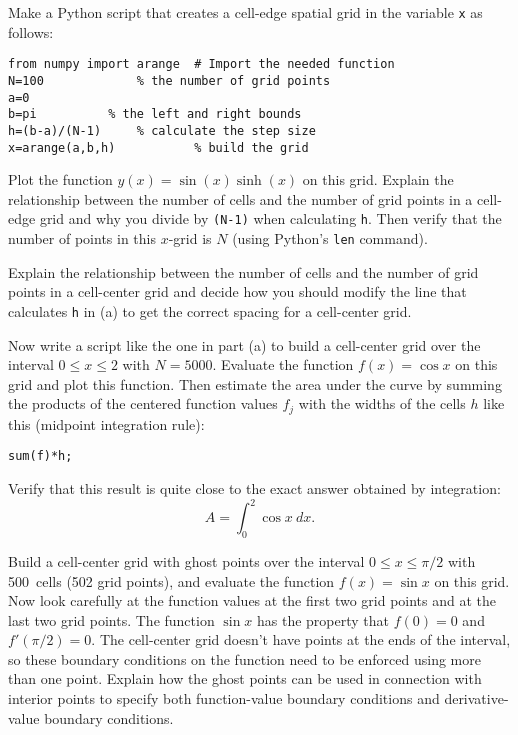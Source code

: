 \begin{enumerate}
\prob \label{P:1.1}
\begin{enumerate}
\subprob \label{P:1.1a} Make a Python script that creates a
    cell-edge spatial grid in the variable {\tt x} as
    follows: 
\begin{Verbatim}
from numpy import arange  # Import the needed function
N=100             % the number of grid points
a=0
b=pi          % the left and right bounds
h=(b-a)/(N-1)     % calculate the step size
x=arange(a,b,h)           % build the grid
\end{Verbatim}
    Plot the function $y(x) = \sin(x) \sinh(x)$ on this grid.
    Explain the relationship between the number of cells and
    the number of grid points in a cell-edge grid and why you
    divide by {\tt (N-1)} when calculating {\tt h}. Then
    verify that the number of points in this $x$-grid is $N$
    (using Python's {\tt len} command).

\subprob \label{P:1.1b} Explain the relationship between the
    number of cells and the number of grid points in a
    cell-center grid and decide how you should modify the
    line that calculates {\tt h} in (a) to get the correct
    spacing for a cell-center grid.


    Now write a script like the one in part (a) to build a cell-center
    grid over the interval $0 \le x \le 2$ with $N=5000$. Evaluate the
    function $f(x)=\cos{x}$ on this grid and plot this function. Then
    estimate the area under the curve by summing the products of the
    centered function values $f_j$ with the widths of the cells $h$
    like this (midpoint integration rule):
\begin{Verbatim}
sum(f)*h;
\end{Verbatim}

    Verify that this result is quite close to the exact
    answer obtained by integration:
    \[
        A=\int_0^2 \cos{x} ~dx.
    \]

\subprob Build a cell-center grid with ghost points over the
    interval $0 \le x \le \pi/2$ with 500~cells (502 grid
    points), and evaluate the function $f(x)=\sin{x}$ on this
    grid.  Now look carefully at the function values at the
    first two grid points and at the last two grid points.
    The function $\sin{x}$ has the property that $f(0)=0$ and
    $f'(\pi/2)=0$. The cell-center grid doesn't have points
    at the ends of the interval, so these boundary conditions
    on the function need to be enforced using more than one
    point. Explain how the ghost points can be used in
    connection with interior points to specify both
    function-value boundary conditions and derivative-value
    boundary conditions.
\end{enumerate}
\end{enumerate}

